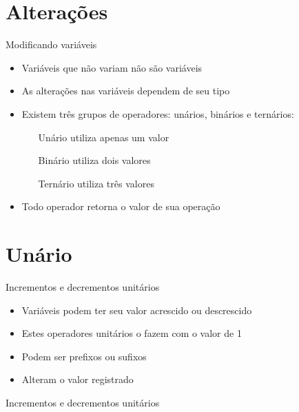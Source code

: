 \documentclass[11pt]{beamer}
\subtitle{Qual o resultado?}
\begin{document}
\titlepage

\begin{frame}
	\tableofcontents
\end{frame}

\section{Alterações}
	\begin{frame}{Modificando variáveis}
		\begin{itemize}
			\presentationPause\item Variáveis que não variam não são variáveis
			\presentationPause\item As alterações nas variáveis dependem de seu tipo
			\presentationPause\item Existem três grupos de operadores: unários, binários e ternários:
			\begin{itemize}
				\presentationPause\item[Unário] utiliza apenas um valor
				\presentationPause\item[Binário] utiliza dois valores
				\presentationPause\item[Ternário] utiliza três valores
			\end{itemize}
			\presentationPause\item Todo operador retorna o valor de sua operação
		\end{itemize}
	\end{frame}

\section{Unário}
	\begin{frame}{Incrementos e decrementos unitários}
		\begin{itemize}
			\presentationPause\item Variáveis podem ter seu valor acrescido ou descrescido
			\presentationPause\item Estes operadores unitários o fazem com o valor de 1
			\presentationPause\item Podem ser prefixos ou sufixos
			\presentationPause\item Alteram o valor registrado
		\end{itemize}
		\presentationPause
	\end{frame}\begin{frame}{Incrementos e decrementos unitários}
		
	\end{frame}
\end{document}
